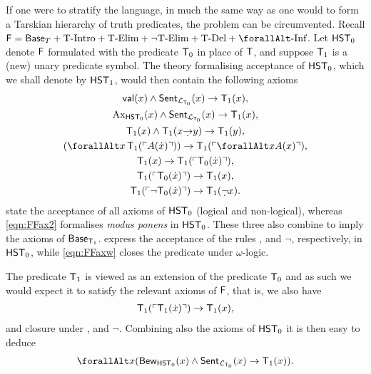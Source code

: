 \documentclass[UKenglish,cleveref,DIV=12]{scrartcl}
\let\forall\forallAlt
\theoremstyle{definition}
\theoremstyle{definition}
\begin{document}
If one were to stratify the language, in much the same way as one would to form a Tarskian hierarchy of truth predicates, the problem can be circumvented. Recall $\F=\BaseT+\text{T-Intro}+\text{T-Elim}+\text{$\lnot$T-Elim}+\text{T-Del}+\text{$\forall$-Inf}$. Let $\mathsf{HST}_0$ denote $\mathsf{F}$ formulated with the predicate $\mathsf{T}_0$ in place of $\mathsf{T}$, and suppose $\mathsf{T}_1$ is a (new) unary predicate symbol. The theory formalising acceptance of $\mathsf{HST}_0$, which we shall denote by $\mathsf{HST}_1$, would then contain the following axioms
\begin{gather}
  \valid(x)\land\Sent_{\L_{\T_0}}(x)\rightarrow \T_1(x),\label{eqn:FFax0}\\
  \set{Ax}_{\HST_0}(x)\land\Sent_{\L_{\T_0}}(x)\rightarrow \T_1(x),\label{eqn:FFax1}\\
  \T_1(x)\land \T_1(x\dimplies y)\rightarrow \T_1(y),\label{eqn:FFax2}\\
  (\forall x\,\T_1(\gn{A(\dot x)}))\rightarrow \T_1(\gn{\forall xA(x)}),\label{eqn:FFaxw}\\
  \T_1(x)\rightarrow \T_1(\gn{\T_0(\dot x)}),\label{eqn:FFax3}\\
  \T_1(\gn{\T_0(\dot x)})\rightarrow \T_1(x),\label{eqn:FFax4}\\
  \T_1(\gn{\lnot \T_0(\dot x)})\rightarrow \T_1(\dlnot x).\label{eqn:FFax5}
\end{gather}
 state the acceptance of all axioms of $\mathsf{HST}_0$ (logical and non-logical), whereas \cref{eqn:FFax2} formalises {\em modus ponens} in $\mathsf{HST}_0$. These three also combine to imply the axioms of $\mathsf{Base}_{\mathsf{T}_1}$.  express the acceptance of the rules ,  and
$\lnot$, respectively, in $\mathsf{HST}_0$, while \cref{eqn:FFaxw} closes the
predicate under $\omega$-logic.

The predicate $\mathsf{T}_1$ is viewed as an extension of the predicate $\mathsf{T}_0$ and as such
we would expect it to satisfy the relevant axioms of $\mathsf{F}$, that is, we also have %
\begin{gather*}%
 \T_1(\gn{\T_1(\dot x)})\rightarrow \T_1(x),
\end{gather*}
and closure under ,  and $\lnot$. Combining
also the axioms of $\mathsf{HST}_0$ it is then easy to deduce
\begin{align}\label{eqn:F1reflection}
  \forall x( \Prov_{\HST_0}(x)\land\Sent_{\L_{\T_0}}(x)\rightarrow \T_1(x)).
\end{align}
\end{document}
